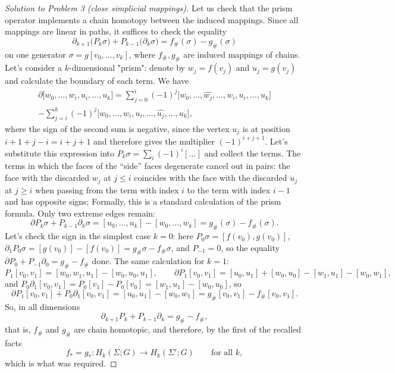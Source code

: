 \documentclass[a4paper,12pt]{report}
\begin{document}
\begin{proof}[Solution to Problem \textup{3} \textup{(}close simplicial mappings\textup{)}]
Let us check that the prism operator implements a chain homotopy between the induced mappings. Since all mappings are linear in paths, it suffices to check the equality
\[
\partial_{k+1}\bigl(P_k\sigma\bigr)+P_{k-1}\bigl(\partial_k\sigma\bigr)=f_\#(\sigma)-g_\#(\sigma)
\]
on one generator $\sigma=g[v_0,\dots,v_k]$, where $f_\#,g_\#$ are induced mappings of chains. Let's consider a $k$-dimensional "prism": denote by $w_j=f(v_j)$ and $u_j=g(v_j)$ and calculate the boundary of each term. We have
\begin{multline*}
\partial\bigl[w_0,\dots,w_i,u_i,\dots,u_k\bigr]
=\sum_{j=0}^{i}(-1)^j\bigl[w_0,\dots,\widehat{w_j},\dots,w_i,u_i,\dots,u_k\bigr]\\
-\sum_{j=i}^{k}(-1)^j\bigl[w_0,\dots,w_i,u_i,\dots,\widehat{u_j},\dots,u_k\bigr],
\end{multline*}
where the sign of the second sum is negative, since the vertex $u_j$ is at position $i+1+j-i=i+j+1$ and therefore gives the multiplier $(-1)^{i+j+1}$. Let's substitute this expression into $P_k\sigma=\sum_i(-1)^i[\dots]$ and collect the terms. The terms in which the faces of the ``side'' faces degenerate cancel out in pairs: the face with the discarded $w_j$ at $j\le i$ coincides with the face with the discarded $u_j$ at $j\ge i$ when passing from the term with index $i$ to the term with index $i-1$ and has opposite signs; Formally, this is a standard calculation of the prism formula. Only two extreme edges remain:
\[
\partial P_k\sigma+P_{k-1}\partial_k\sigma=[u_0,\dots,u_k]-[w_0,\dots,w_k]=g_\#(\sigma)-f_\#(\sigma) .
\]
Let's check the sign in the simplest case $k=0$: here $P_0\sigma=[f(v_0),g(v_0)]$, $\partial_1P_0\sigma=[g(v_0)]-[f(v_0)]=g_\#\sigma-f_\#\sigma$, and $P_{-1}=0$, so the equality $\partial P_0+P_{-1}\partial_0=g_\#-f_\#$ done. The same calculation for $k=1$:
\[
P_1[v_0,v_1]=[w_0,w_1,u_1]-[w_0,u_0,u_1],\qquad
\partial P_1[v_0,v_1]=[u_0,u_1]+[w_0,u_0]-[w_1,u_1]-[w_0,w_1],
\]
and $P_0\partial_1[v_0,v_1]=P_0[v_1]-P_0[v_0]=[w_1,u_1]-[w_0,u_0]$, so
\[
\partial P_1[v_0,v_1]+P_0\partial_1[v_0,v_1]=[u_0,u_1]-[w_0,w_1]=g_\#[v_0,v_1]-f_\#[v_0,v_1].
\]
So, in all dimensions
\[
\partial_{k+1}P_k+P_{k-1}\partial_k=g_\#-f_\# ,
\]
that is, $f_\#$ and $g_\#$ are chain homotopic, and therefore, by the first of the recalled facts
\[
f_*=g_*\colon H_k(\Sigma;G)\to H_k(\Sigma';G)\qquad\text{for all } k ,
\]
which is what was required.


\end{proof}
\end{document}
